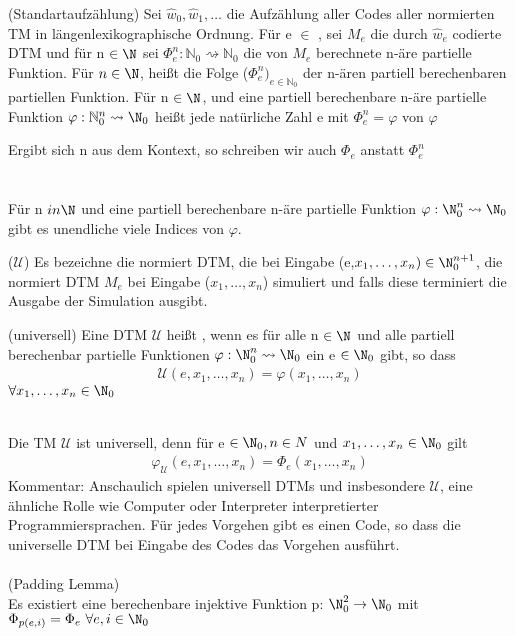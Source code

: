 \documentclass[a4paper]{article}
\begin{document}
\begin{DefBox}{(Standartaufzählung)}
Sei $\hat{w}_0, \hat{w}_1,\dots$ die Aufzählung aller Codes aller normierten TM in längenlexikographische Ordnung. Für e $\in$ \NN, sei $M_e$ die durch $\hat{w}_e$ codierte DTM und für n $\in \N$ sei
$\Phi^n_e : \mathbb{N}_0 \rightsquigarrow \mathbb{N}_0$ die von $M_e$ berechnete n-äre partielle Funktion. Für $n \in \N$, heißt die Folge ($\Phi_e^n)_{e \in \mathbb{N}_{0}}$  der n-ären partiell berechenbaren partiellen Funktion. Für n $\in \N$, und eine partiell berechenbare n-äre partielle Funktion $\varphi : \mathbb{N}_0^n \rightsquigarrow \N_0$ heißt jede natürliche Zahl e mit $\Phi_e^n = \varphi$  von $\varphi$
\end{DefBox}
Ergibt sich n aus dem Kontext, so schreiben wir auch $\Phi_e$ anstatt $\Phi_e^n$  \\
\\
 \stepBoxCounter \\
Für n $in \N$ und eine partiell berechenbare n-äre partielle Funktion $\varphi : \N_0^n \rightsquigarrow \N_0$ gibt es unendliche viele Indices von $\varphi$.

\begin{DefBox}{($\mathcal{U}$)}
Es bezeichne  die normiert DTM, die bei Eingabe (e,$x_1,\dots,x_n) \in \N_0^{n+1}$, die normiert DTM $M_e$ bei Eingabe ($x_1,\dots,x_n$) simuliert und falls diese terminiert die Ausgabe der Simulation ausgibt.
\end{DefBox}

\begin{DefBox}{(universell)}
 Eine DTM $\mathcal{U}$ heißt , wenn es für alle n $\in \N$ und alle partiell berechenbar partielle Funktionen $\varphi : \N_0^n \rightsquigarrow \N_0$ ein e $\in \N_0$ gibt, so dass
 \begin{align*}
  \mathcal{U} (e,x_1,\dots,x_n) = \varphi(x_1,\dots,x_n)
 \end{align*}
 $\forall x_1,\dots,x_n \in \N_0$
\end{DefBox}
 \stepBoxCounter \\
Die TM $\mathcal{U}$ ist universell, denn für e $\in \N_0, n \in N$ und $x_1,\dots,x_n \in \N_0$ gilt
\begin{align*}
 \varphi_{\mathcal{U}} (e,x_1,\dots,x_n) = \Phi_e (x_1,\dots,x_n)
\end{align*}
Kommentar: Anschaulich spielen universell DTMs und insbesondere $\mathcal{U}$, eine ähnliche Rolle wie Computer oder Interpreter interpretierter Programmiersprachen. Für jedes Vorgehen gibt es einen Code, so dass die universelle DTM bei Eingabe des Codes das Vorgehen ausführt. \\
\\
 (Padding Lemma) \stepBoxCounter \\
Es existiert eine berechenbare injektive Funktion p: $\N_0^2 \rightarrow \N_0$ mit $\Phi_{p(e,i)} = \Phi_e \ \forall e,i \in \N_0$
\end{document}
